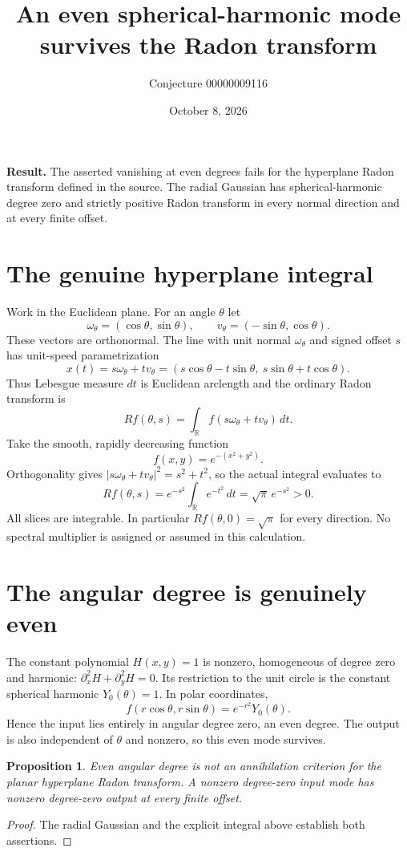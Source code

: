 \documentclass[11pt]{article}
\title{An even spherical-harmonic mode survives the Radon transform}
\author{Conjecture 00000009116}
\date{October 8, 2026}
\newtheorem{proposition}{Proposition}
\begin{document}
\maketitle
\noindent\textbf{Result.} The asserted vanishing at even degrees fails for the hyperplane Radon transform defined in the source. The radial Gaussian has spherical-harmonic degree zero and strictly positive Radon transform in every normal direction and at every finite offset.

\section*{The genuine hyperplane integral}
Work in the Euclidean plane. For an angle $\theta$ let
\[
 \omega_\theta=(\cos\theta,\sin\theta),\qquad
 v_\theta=(-\sin\theta,\cos\theta).
\]
These vectors are orthonormal. The line with unit normal $\omega_\theta$ and signed offset $s$ has unit-speed parametrization
\[
 x(t)=s\omega_\theta+t v_\theta
 =(s\cos\theta-t\sin\theta,\ s\sin\theta+t\cos\theta).
\]
Thus Lebesgue measure $dt$ is Euclidean arclength and the ordinary Radon transform is
\[
 Rf(\theta,s)=\int_{\mathbb R} f(s\omega_\theta+t v_\theta)\,dt.
\]
Take the smooth, rapidly decreasing function
\[
 f(x,y)=e^{-(x^2+y^2)}.
\]
Orthogonality gives $|s\omega_\theta+t v_\theta|^2=s^2+t^2$, so the actual integral evaluates to
\[
 Rf(\theta,s)=e^{-s^2}\int_{\mathbb R}e^{-t^2}\,dt
 =\sqrt\pi\,e^{-s^2}>0.
\]
All slices are integrable. In particular $Rf(\theta,0)=\sqrt\pi$ for every direction. No spectral multiplier is assigned or assumed in this calculation.

\section*{The angular degree is genuinely even}
The constant polynomial $H(x,y)=1$ is nonzero, homogeneous of degree zero and harmonic: $\partial_x^2H+\partial_y^2H=0$. Its restriction to the unit circle is the constant spherical harmonic $Y_0(\theta)=1$. In polar coordinates,
\[
 f(r\cos\theta,r\sin\theta)=e^{-r^2}Y_0(\theta).
\]
Hence the input lies entirely in angular degree zero, an even degree. The output is also independent of $\theta$ and nonzero, so this even mode survives.

\newpage
\begin{proposition}
Even angular degree is not an annihilation criterion for the planar hyperplane Radon transform. A nonzero degree-zero input mode has nonzero degree-zero output at every finite offset.
\end{proposition}
\begin{proof}
The radial Gaussian and the explicit integral above establish both assertions.
\end{proof}
\end{document}
